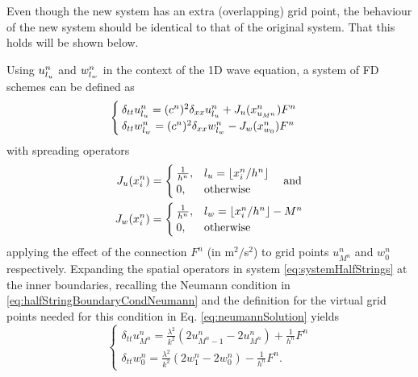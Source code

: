 Even though the new system has an extra (overlapping) grid point, the behaviour of the new system should be identical to that of the original system. That this holds will be shown below.

Using $u_{l_u}^n$ and $w_{l_w}^n$ in the context of the 1D wave equation, a system of FD schemes can be defined as
\begin{equation}
    \begin{cases}\label{eq:systemHalfStrings}
        \delta_{tt}u_{l_u}^n = (c^n)^2\delta_{xx}u_{l_u}^n + J_u(x_{u_{M^n}}^n)F^n\\
        \delta_{tt}w_{l_w}^n = (c^n)^2\delta_{xx}w_{l_w}^n - J_w(x_{w_0}^n)F^n
    \end{cases}
\end{equation}
with spreading operators
\begin{equation}\label{eq:spreadingOperators}
    \begin{aligned}
    J_u(x_i^n)& =
    \begin{cases}
        \frac{1}{h^n}, & {l_u} = \lfloor x_i^n/h^n\rfloor\\
        0,& \text{otherwise}
    \end{cases}
    \quad\text{and}\\
    J_w(x_i^n) &=
    \begin{cases}
        \frac{1}{h^n}, & {l_w} = \lfloor x_i^n/h^n \rfloor - M^n\\
        0,& \text{otherwise}
    \end{cases}
\end{aligned}
\end{equation}
applying the effect of the connection %
$F^n$ (in m$^2/$s$^2$) to grid points $u_{M^n}^n$ and $w_0^n$ respectively.
%
Expanding the spatial operators in system \eqref{eq:systemHalfStrings} at the inner boundaries, recalling the Neumann condition in  \eqref{eq:halfStringBoundaryCondNeumann} and the definition for the virtual grid points needed for this condition in Eq. \eqref{eq:neumannSolution} yields
\begin{equation}\label{eq:expandedSystem}
    \begin{cases}
        \delta_{tt}u_{M^n}^n = \frac{\lambda^2}{k^2}(2u_{M^n-1}^n-2u_{M^n}^n) + \frac{1}{h^n}F^n\\
        \delta_{tt}w_0^n = \frac{\lambda^2}{k^2}(2w_1^n-2w_0^n) - \frac{1}{h^n}F^n.
    \end{cases}
\end{equation}
